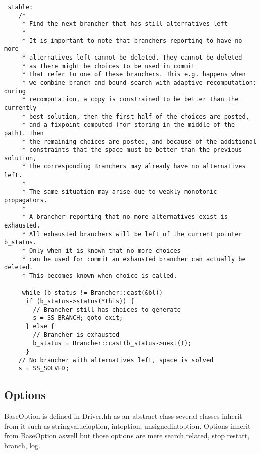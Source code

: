 \documentclass[a4paper,10pt]{article}
\begin{document}
\begin{verbatim}
 stable:
    /*
     * Find the next brancher that has still alternatives left
     *
     * It is important to note that branchers reporting to have no more
     * alternatives left cannot be deleted. They cannot be deleted
     * as there might be choices to be used in commit
     * that refer to one of these branchers. This e.g. happens when
     * we combine branch-and-bound search with adaptive recomputation: during
     * recomputation, a copy is constrained to be better than the currently
     * best solution, then the first half of the choices are posted,
     * and a fixpoint computed (for storing in the middle of the path). Then
     * the remaining choices are posted, and because of the additional
     * constraints that the space must be better than the previous solution,
     * the corresponding Branchers may already have no alternatives left.
     *
     * The same situation may arise due to weakly monotonic propagators.
     *
     * A brancher reporting that no more alternatives exist is exhausted.
     * All exhausted branchers will be left of the current pointer b_status.
     * Only when it is known that no more choices
     * can be used for commit an exhausted brancher can actually be deleted.
     * This becomes known when choice is called.
     
     while (b_status != Brancher::cast(&bl))
      if (b_status->status(*this)) {
        // Brancher still has choices to generate
        s = SS_BRANCH; goto exit;
      } else {
        // Brancher is exhausted
        b_status = Brancher::cast(b_status->next());
      }
    // No brancher with alternatives left, space is solved
    s = SS_SOLVED;
\end{verbatim}

\subsection{Options}
BaseOption is defined in Driver.hh as an abstract class several classes inherit from it such as stringvalueioption, 
intoption, unsignedintoption. Options inherit from BaseOption aswell but those options are mere search related, stop 
restart, branch, log.  
\end{document}
